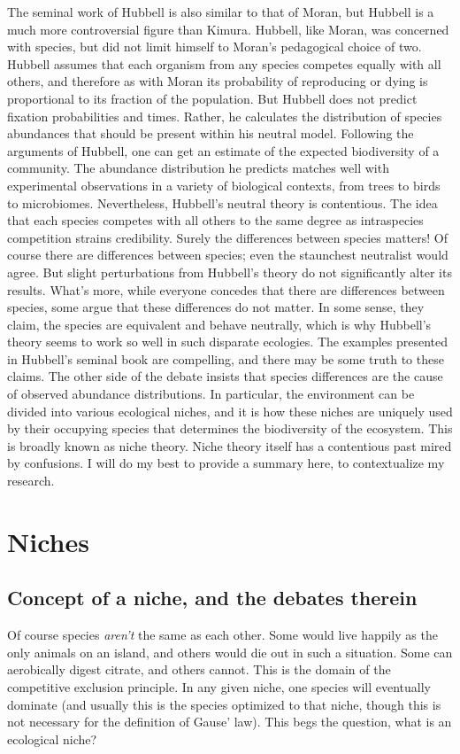 The seminal work of Hubbell \cite{Hubbell2001} is also similar to that of Moran, but Hubbell is a much more controversial figure than Kimura. 
Hubbell, like Moran, was concerned with species, but did not limit himself to Moran's pedagogical choice of two. 
Hubbell assumes that each organism from any species competes equally with all others, and therefore as with Moran its probability of reproducing or dying is proportional to its fraction of the population. 
But Hubbell does not predict fixation probabilities and times. 
Rather, he calculates the distribution of species abundances that should be present within his neutral model. 
Following the arguments of Hubbell, one can get an estimate of the expected biodiversity of a community. 
The abundance distribution he predicts matches well with experimental observations in a variety of biological contexts, from trees to birds to microbiomes. 
Nevertheless, Hubbell's neutral theory is contentious. 
The idea that each species competes with all others to the same degree as intraspecies competition strains credibility. 
Surely the differences between species matters! 
Of course there are differences between species; even the staunchest neutralist would agree. 
But slight perturbations from Hubbell's theory do not significantly alter its results. 
What's more, while everyone concedes that there are differences between species, some argue that these differences do not matter. 
In some sense, they claim, the species are equivalent and behave neutrally, which is why Hubbell's theory seems to work so well in such disparate ecologies. 
The examples presented in Hubbell's seminal book are compelling, and there may be some truth to these claims. 
The other side of the debate insists that species differences are the cause of observed abundance distributions. 
In particular, the environment can be divided into various ecological niches, and it is how these niches are uniquely used by their occupying species that determines the biodiversity of the ecosystem. 
This is broadly known as niche theory. 
Niche theory itself has a contentious past mired by confusions. 
I will do my best to provide a summary here, to contextualize my research. 


\section{Niches}
\subsection{Concept of a niche, and the debates therein}
Of course species \emph{aren't} the same as each other. 
Some would live happily as the only animals on an island, and others would die out in such a situation. 
Some can aerobically digest citrate, and others cannot. 
This is the domain of the competitive exclusion principle. In any given niche, one species will eventually dominate (and usually this is the species optimized to that niche, though this is not necessary for the definition of Gause' law). 
This begs the question, what is an ecological niche? 

